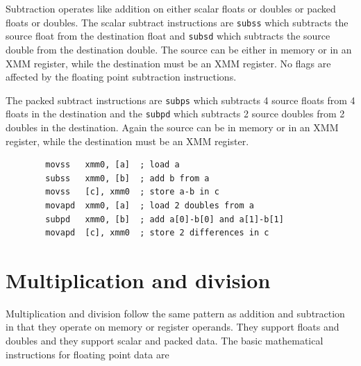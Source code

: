 \documentclass[11pt,b5paper]{book}
\begin{document}
Subtraction operates like addition on either scalar floats or doubles or packed floats or doubles.
The scalar subtract instructions are {\tt subss} which subtracts the source float from the
destination float and {\tt subsd} which subtracts the source double from the destination double.
The source can be either in memory or in an XMM register, while the destination must be an XMM register.
No flags are affected by the floating point subtraction instructions.

The packed subtract instructions are {\tt subps} which subtracts 4 source floats from 4 floats in
the destination and the {\tt subpd} which subtracts 2 source doubles from 2 doubles in the destination.
Again the source can be in memory or in an XMM register, while the destination must be an XMM register.

\begin{verbatim}
        movss   xmm0, [a]  ; load a
        subss   xmm0, [b]  ; add b from a
        movss   [c], xmm0  ; store a-b in c
        movapd  xmm0, [a]  ; load 2 doubles from a
        subpd   xmm0, [b]  ; add a[0]-b[0] and a[1]-b[1]
        movapd  [c], xmm0  ; store 2 differences in c
\end{verbatim}

\section{Multiplication and division}

Multiplication and division follow the same pattern as addition and subtraction in that they operate on
memory or register operands.
They support floats and doubles and they support scalar and packed data.
The basic mathematical instructions for floating point data are
\end{document}

